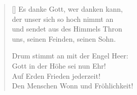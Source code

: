 \begin{multicols}{2}
\begin{verse}[\versewidth]
 Es danke Gott, wer danken kann,\\
der unser sich so hoch nimmt an\\
und sendet aus des Himmels Thron\\
uns, seinen Feinden, seinen Sohn.
 
 Drum stimmt an mit der Engel Heer:\\
Gott in der Höhe sei nun Ehr!\\
Auf Erden Frieden jederzeit!\\
Den Menschen Wonn und Fröhlichkeit!
   
\end{verse}
\end{multicols}

